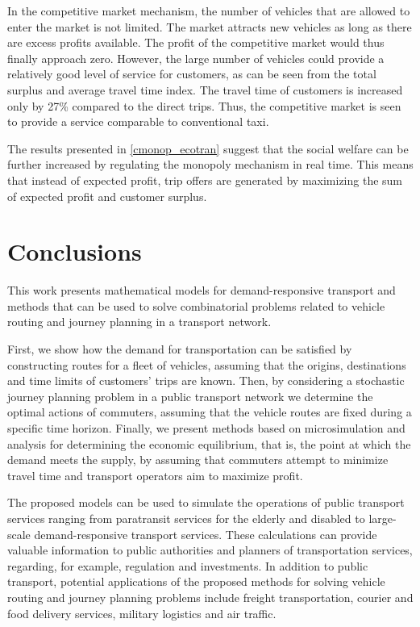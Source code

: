 \documentclass[dissertation,draft*]{aaltoseries}
\begin{document}
In the competitive market mechanism, the number of vehicles that are allowed to enter the market is not limited. The market attracts new vehicles as long as there are excess profits available. The profit of the competitive market would thus finally approach zero. However, the large number of vehicles could provide a relatively good level of service for customers, as can be seen from the total surplus and average travel time index. 
The travel time of customers is increased only by 27\% compared to the direct trips. Thus, the competitive market is seen to
provide a service comparable to conventional taxi.

The results presented in \ref{cmonop_ecotran} suggest that the social welfare can be further increased by 
regulating the monopoly mechanism in real time. This means that instead of expected profit, trip offers are generated by maximizing 
the sum of expected profit and customer surplus. 


\chapter{Conclusions}
\label{conclusions}
This work presents mathematical models for demand-responsive transport and methods
that can be used to solve combinatorial problems related to vehicle routing and journey planning
in a transport network.

First,
we show how the demand for transportation can be satisfied by constructing routes for a fleet of vehicles,
assuming that the origins, destinations and time limits of customers' trips are known.
Then, by considering a stochastic journey planning problem in a public transport network we determine
the optimal actions of commuters, assuming that the vehicle routes are fixed during a specific time horizon.
Finally, we present methods based on microsimulation and analysis
for determining the economic equilibrium, that is, the point at which the demand meets the supply,
by assuming that commuters attempt to minimize travel time and transport operators aim to maximize profit.

The proposed models can be used to simulate the operations of public transport services ranging 
from paratransit services for the elderly and disabled to 
large-scale demand-responsive transport services. These calculations can 
provide valuable information to public authorities and planners of transportation services,
regarding, for example, regulation and investments.
In addition to public transport, potential applications of the proposed methods for solving vehicle routing and journey planning problems
include freight transportation, courier and food delivery services, military logistics and air traffic.
\end{document}
